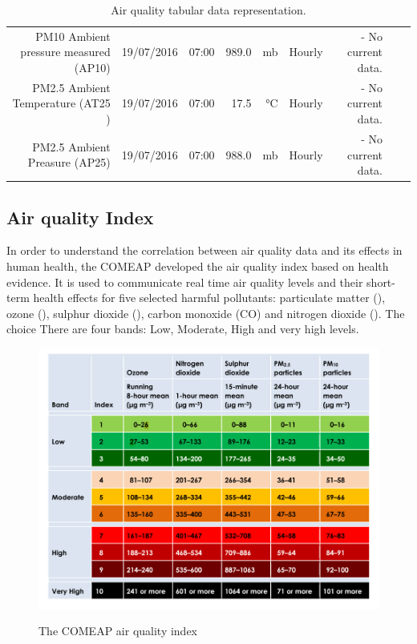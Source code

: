 \begin{table}[ht]
\begin{adjustbox}{width=1.2\textwidth,center=\textwidth}
\begin{tabular}{rlrrrrrrr}
	PM10 Ambient pressure measured (AP10) & 19/07/2016 & 07:00 & 989.0 & mb & Hourly & - No current data. \\
	PM2.5 Ambient Temperature (AT25 ) & 19/07/2016 & 07:00 & 17.5 & °C & Hourly & - No current data. \\
	PM2.5 Ambient Preasure (AP25) & 19/07/2016 & 07:00 & 988.0 & mb & Hourly & - No current data. \\
   \hline
\end{tabular}
\end{adjustbox}
\caption{Air quality tabular data representation. \cite{DepartmentforEnvironment}}
\label{tab:pollution_tabular_data}
\end{table} 

\subsection{Air quality Index}
In order to understand the correlation between air quality data and its effects in human health, the \ac{COMEAP} developed the air quality index based on health evidence. It is used to communicate real time air quality levels and their short-term health effects for five selected harmful pollutants: particulate matter (\PMTEN), ozone (\OTHREE), sulphur dioxide (\SOTWO), carbon monoxide (CO) and nitrogen dioxide (\NOTWO). The choice 
There are four bands: Low, Moderate, High and very high levels. 

\begin{figure}[!htb]
\begin{adjustbox}{width=1\textwidth,center=\textwidth}
  \centering
  \includegraphics[scale=.8]{images/air_quality_index.png}
  \label{fig:air_quality_index}
\end{adjustbox}
  \caption[Great smog of 1952]{The COMEAP air quality index \cite{HealthProtectionAgencyfortheCommitteeontheMedicalEffectsofAirPollutants2011}}
\end{figure}



